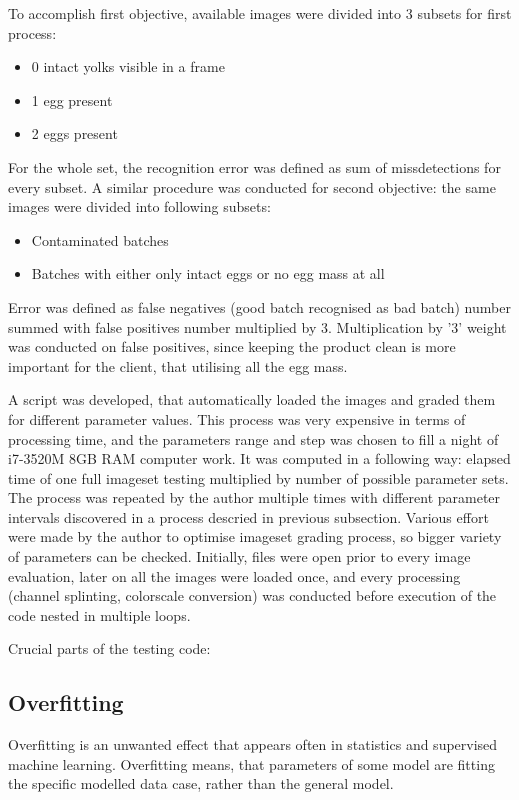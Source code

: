 \documentclass[12pt,twoside,a4paper]{article}
\begin{document}
To accomplish first objective, available images were divided into 3 subsets for first process:
\begin{itemize}
\item 0 intact yolks visible in a frame
\item 1 egg present
\item 2 eggs present
\end{itemize}
For the whole set, the recognition error was defined  as sum of missdetections for every subset.
A similar procedure was conducted for second objective: the same images were divided into following subsets:
\begin{itemize}
\item Contaminated batches
\item Batches with either only intact eggs or no egg mass at all
\end{itemize}
Error was defined as false negatives (good batch recognised as bad batch) number summed with false positives number multiplied by 3.
Multiplication by '3' weight was conducted on false positives, since keeping the product clean is more important for the client, that utilising all the egg mass. 

A script was developed, that automatically loaded the images and graded them for different parameter values.
This process was very expensive in terms of processing time, and the parameters range and step was chosen to fill a night of i7-3520M 8GB RAM computer work.
It was computed in a following way: elapsed time of one full imageset testing multiplied by number of possible parameter sets.
The process was repeated by the author multiple times with different parameter intervals discovered in a process descried in previous subsection.
Various effort were made by the author to optimise imageset grading process, so bigger variety of parameters can be checked.
Initially, files were open prior to every image evaluation, later on all the images were loaded once, and every processing (channel splinting, colorscale conversion) was conducted before execution of the code nested in multiple loops.

Crucial parts of the testing code:



\subsection{Overfitting}
Overfitting is an unwanted effect that appears often in statistics and supervised machine learning.
Overfitting means, that parameters of some model are fitting the specific modelled data case, rather than the general model.
\end{document}

